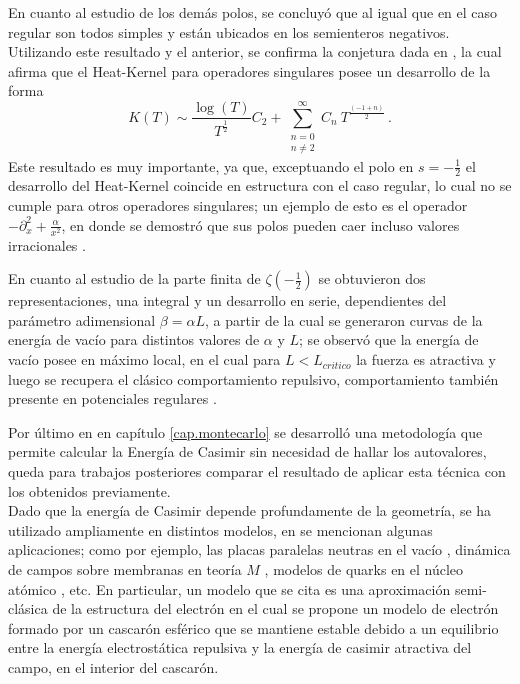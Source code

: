 En cuanto al estudio de los demás polos, se concluyó que al igual que en el caso regular son todos simples y están ubicados en los semienteros negativos. Utilizando este resultado y el anterior, se confirma la conjetura dada en \cite{callias1980}, la cual afirma que el Heat-Kernel para operadores singulares posee un desarrollo de la forma  
\begin{equation}
	K(T) \sim 
	\frac{ \log (T)}{T ^{\frac{1}{2} }} C _{2} +
	\sum _{\substack{n=0 \\ n \neq 2}} ^{\infty}
	C _n  \ 
	T^{\frac{(-1+n)}{2}} 
\, .
\end{equation}
Este resultado es muy importante, ya que, exceptuando el polo en $s = - \frac{1}{2}$ el desarrollo del Heat-Kernel coincide en estructura con el caso regular, lo cual no se cumple para otros operadores singulares; un ejemplo de esto es el operador $- \partial ^2 _x + \frac{\alpha}{x ^2}$, en donde se demostró que sus polos pueden caer incluso valores irracionales \cite{doi:10.1063/1.1809257}.


En cuanto al estudio de la parte finita de $\zeta \left( - \frac{1}{2} \right)$ se obtuvieron dos representaciones, una integral y un desarrollo en serie, dependientes del parámetro adimensional $\beta = \alpha L$, a partir de la cual se generaron curvas de la energía de vacío para distintos valores de $\alpha$ y $L$; se observó que la energía de vacío posee en máximo local, en el cual para  $L < L _{critico} $ la fuerza es atractiva y luego se recupera el clásico comportamiento repulsivo, comportamiento también presente en potenciales regulares \cite{Beauregard_2013}.
 


Por último en en capítulo \ref{cap.montecarlo} se desarrolló una metodología que permite calcular la Energía de Casimir sin necesidad de hallar los autovalores, queda para trabajos posteriores comparar el resultado de aplicar esta técnica con los obtenidos previamente.\\


Dado que la energía de Casimir depende profundamente de la geometría, se ha utilizado ampliamente en distintos modelos, en \cite{Blau_1988} se mencionan algunas aplicaciones; como por ejemplo, las placas paralelas neutras en el vacío \cite{PLUNIEN198687}, dinámica de campos sobre membranas en teoría $M$ \cite{DEWIT1988545}, modelos de quarks en el núcleo atómico \cite{PhysRevD.14.2622}, etc. En particular, un modelo que se cita es una aproximación semi-clásica de la estructura del electrón \cite{MILTON198049} en el cual se propone un modelo de electrón formado por un cascarón esférico que se mantiene estable debido a un equilibrio entre la  energía electrostática repulsiva y la energía de casimir atractiva del campo, en el interior del cascarón.

